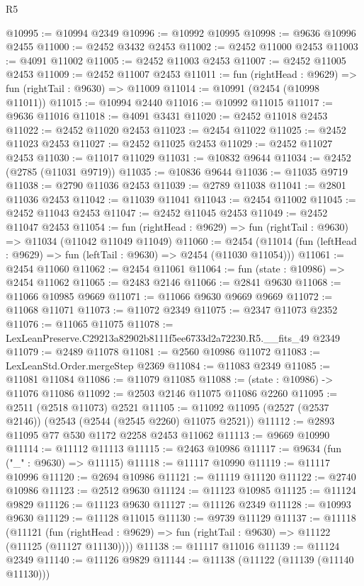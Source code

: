 \begin{lexlean}{R5}
\begin{coremodule}
@10995 := @10994 @2349
@10996 := @10992 @10995
@10998 := @9636 @10996 @2455
@11000 := @2452 @3432 @2453
@11002 := @2452 @11000 @2453
@11003 := @4091 @11002
@11005 := @2452 @11003 @2453
@11007 := @2452 @11005 @2453
@11009 := @2452 @11007 @2453
@11011 := fun (rightHead : @9629) => fun (rightTail : @9630) => @11009
@11014 := @10991 (@2454 (@10998 @11011))
@11015 := @10994 @2440
@11016 := @10992 @11015
@11017 := @9636 @11016
@11018 := @4091 @3431
@11020 := @2452 @11018 @2453
@11022 := @2452 @11020 @2453
@11023 := @2454 @11022
@11025 := @2452 @11023 @2453
@11027 := @2452 @11025 @2453
@11029 := @2452 @11027 @2453
@11030 := @11017 @11029
@11031 := @10832 @9644
@11034 := @2452 (@2785 (@11031 @9719))
@11035 := @10836 @9644
@11036 := @11035 @9719
@11038 := @2790 @11036 @2453
@11039 := @2789 @11038
@11041 := @2801 @11036 @2453
@11042 := @11039 @11041
@11043 := @2454 @11002
@11045 := @2452 @11043 @2453
@11047 := @2452 @11045 @2453
@11049 := @2452 @11047 @2453
@11054 := fun (rightHead : @9629) => fun (rightTail : @9630) => @11034 (@11042 @11049 @11049)
@11060 := @2454 (@11014 (fun (leftHead : @9629) => fun (leftTail : @9630) => @2454 (@11030 @11054)))
@11061 := @2454 @11060
@11062 := @2454 @11061
@11064 := fun (state : @10986) => @2454 @11062
@11065 := @2483 @2146
@11066 := @2841 @9630
@11068 := @11066 @10985 @9669
@11071 := @11066 @9630 @9669 @9669
@11072 := @11068 @11071
@11073 := @11072 @2349
@11075 := @2347 @11073 @2352
@11076 := @11065 @11075
@11078 := LexLeanPreserve.C29213a82902b8111f5ee6733d2a72230.R5.__fits_49 @2349
@11079 := @2489 @11078
@11081 := @2560 @10986 @11072
@11083 := LexLeanStd.Order.mergeStep @2369
@11084 := @11083 @2349
@11085 := @11081 @11084
@11086 := @11079 @11085
@11088 := (state : @10986) -> @11076 @11086
@11092 := @2503 @2146 @11075 @11086 @2260
@11095 := @2511 (@2518 @11073) @2521
@11105 := @11092 @11095 (@2527 (@2537 @2146)) (@2543 (@2544 (@2545 @2260) @11075 @2521))
@11112 := @2893 @11095 @77 @530 @1172 @2258 @2453 @11062
@11113 := @9669 @10990
@11114 := @11112 @11113
@11115 := @2463 @10986
@11117 := @9634 (fun ("_" : @9630) => @11115)
@11118 := @11117 @10990
@11119 := @11117 @10996
@11120 := @2694 @10986
@11121 := @11119 @11120
@11122 := @2740 @10986
@11123 := @2512 @9630
@11124 := @11123 @10985
@11125 := @11124 @9829
@11126 := @11123 @9630
@11127 := @11126 @2349
@11128 := @10993 @9630
@11129 := @11128 @11015
@11130 := @9739 @11129
@11137 := @11118
    (@11121 (fun (rightHead : @9629) => fun (rightTail : @9630) => @11122 (@11125 (@11127 @11130))))
@11138 := @11117 @11016
@11139 := @11124 @2349
@11140 := @11126 @9829
@11144 := @11138 (@11122 (@11139 (@11140 @11130)))

\end{coremodule}
\end{lexlean}
